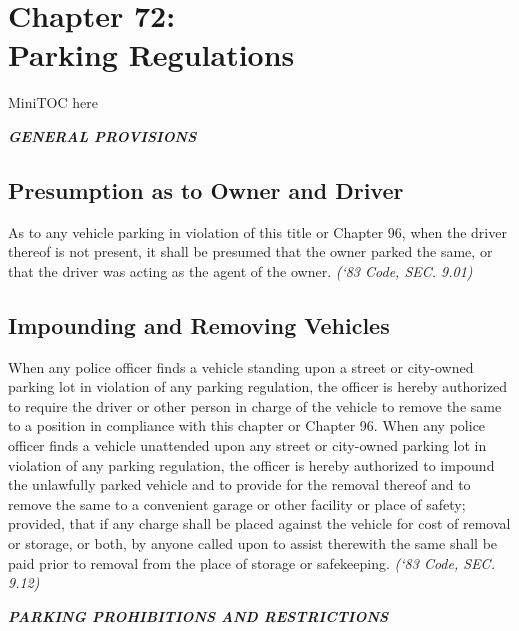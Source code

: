 \documentclass[code.tex]{subfiles}
\begin{document}
\chapter*{Chapter 72: \\
	Parking Regulations}

MiniTOC here
\pagebreak


\begin{center}
\emph{\textbf{\LARGE{GENERAL PROVISIONS}}}
\end{center}

\section{Presumption as to Owner and Driver}
As to any vehicle parking in violation of this title or Chapter 96, when the driver thereof is not present, it shall be presumed that the owner parked the same, or that the driver was acting as the agent of the owner.\newline
\emph{(‘83 Code, SEC. 9.01)}

\section{Impounding and Removing Vehicles}
When any police officer finds a vehicle standing upon a street or city-owned parking lot in violation of any parking regulation, the officer is hereby authorized to require the driver or other person in charge of the vehicle to remove the same to a position in compliance with this chapter or Chapter 96. When any police officer finds a vehicle unattended upon any street or city-owned parking lot in violation of any parking regulation, the officer is hereby authorized to impound the unlawfully parked vehicle and to provide for the removal thereof and to remove the same to a convenient garage or other facility or place of safety; provided, that if any charge shall be placed against the vehicle for cost of removal or storage, or both, by anyone called upon to assist therewith the same shall be paid prior to removal from the place of storage or safekeeping.\newline
\emph{(‘83 Code, SEC. 9.12)}\newline


\begin{center}
\emph{\textbf{\LARGE{PARKING PROHIBITIONS AND RESTRICTIONS}}}
\end{center}

\setcounter{section}{14}
\end{document}

